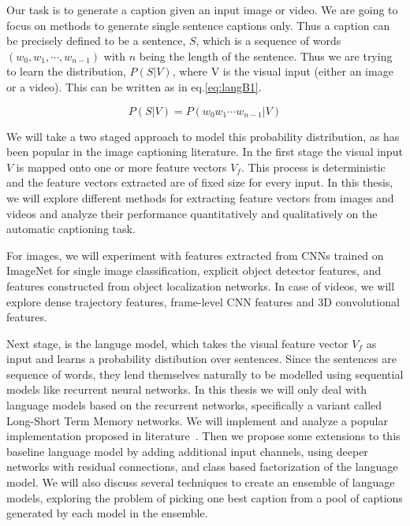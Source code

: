 Our task is to generate a caption given an input image or video. 
We are going to focus on methods to generate single sentence captions only. 
Thus a caption can be precisely defined to be a sentence, $S$, which is a
sequence of words $(w_0, w_1,\cdots, w_{n-1})$ with $n$ being the length of the
sentence. 
Thus we are trying to learn the distribution, $P(S|V)$, where V is the visual
input (either an image or a video). 
This can be written as in eq.\ref{eq:langB1}. 

\begin{equation}
\label{eq:langB1} P(S|V) = P(w_0 w_1 \cdots w_{n-1}|V)
\end{equation}

We will take a two staged approach to model this probability distribution, as
has been popular in the image captioning literature. 
In the first stage the visual input $V$ is mapped onto one or more feature
vectors $V_f$.
This process is deterministic and the feature vectors extracted are of fixed
size for every input. 
In this thesis, we will explore different methods for extracting feature
vectors from images and videos and analyze their performance quantitatively and
qualitatively on the automatic captioning task. 

For images, we will experiment with features extracted from CNNs trained on
ImageNet for single image classification, explicit object detector features, and
features constructed from object localization networks.
In case of videos, we will explore dense trajectory features, frame-level CNN
features and 3D convolutional features. 

Next stage, is the languge model, which takes the visual feature vector $V_f$ as
input and learns a probability distibution over sentences.
Since the sentences are sequence of words, they lend themselves naturally to be
modelled using sequential models like recurrent neural networks.
In this thesis we will only deal with language models based on the recurrent
networks, specifically a variant called Long-Short Term Memory networks.
We will implement and analyze a popular implementation proposed in
literature~\cite{Vinyals_2015_CVPR}.
Then we propose some extensions to this baseline language model by adding
additional input channels, using deeper networks with residual connections,
and class based factorization of the language model. 
We will also discuss several techniques to create an ensemble of language
models, exploring the problem of picking one best caption from a pool of
captions generated by each model in the ensemble.

